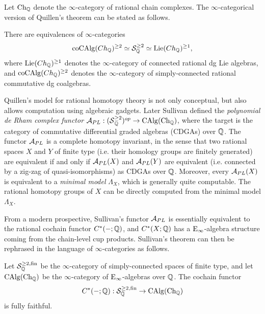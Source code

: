 Let $\operatorname{Ch}_{{\mathbb{Q}}}$ denote the $\infty$-category of rational chain complexes. The $\infty$-categorical version of Quillen's theorem can be stated as follows.
\begin{theorem}
    \cite{Quillen_RHT}
    There are equivalences of $\infty$-categories
    $$
	\operatorname{coCAlg}(Ch_{{\mathbb{Q}}})^{\geq 2}\simeq {\mathcal{S}}^{\geq 2}_{{\mathbb{Q}}} \simeq \operatorname{Lie}(Ch_{{\mathbb{Q}}})^{\geq 1},
	$$
	where $\operatorname{Lie}(Ch_{{\mathbb{Q}}})^{\geq 1}$ denotes the $\infty$-category of connected rational dg Lie algebras, and $\operatorname{coCAlg}(Ch_{{\mathbb{Q}}})^{\geq 2}$ denotes the $\infty$-category of simply-connected rational commutative dg coalgebras.
\end{theorem}
Quillen's model for rational homotopy theory is not only conceptual, but also allows computation using algebraic gadgets. 
Later Sullivan \cite{Sullivan} defined the \emph{polynomial de Rham complex functor} ${\mathcal{A}}_{PL}:(\operatorname{\mathcal{S}}^{\geq 2}_{{\mathbb{Q}}})^{op} \to \operatorname{CAlg}(\operatorname{Ch}_{{\mathbb{Q}}})$, where the target is the category of commutative differential graded algebras (CDGAs) over ${\mathbb{Q}}$.
The functor ${\mathcal{A}}_{PL}$ is a complete homotopy invariant, in the sense that two rational spaces $X$ and $Y$ of finite type (i.e. their homology groups are finitely generated) are equivalent if and only if ${\mathcal{A}}_{PL}(X)$ and ${\mathcal{A}}_{PL}(Y)$ are equivalent (i.e. connected by a zig-zag of quasi-isomorphisms) as CDGAs over ${\mathbb{Q}}$.
Moreover, every ${\mathcal{A}}_{PL}(X)$ is equivalent to a \emph{minimal model} $\Lambda_X$, which is generally quite computable. The rational homotopy groups of $X$ can be directly computed from the minimal model $\Lambda_X$. 

From a modern prospective, Sullivan's functor ${\mathcal{A}}_{PL}$ is essentially equivalent to the rational cochain functor $C^*(-;{\mathbb{Q}})$, and $C^*(X;{\mathbb{Q}})$ has a $\operatorname{E}_\infty$-algebra structure coming from the chain-level cup products. Sullivan's theorem can then be rephrased in the language of $\infty$-categories as follows.
\begin{theorem}
    \cite{Sullivan}
    Let ${\mathcal{S}}^{\geq 2, \operatorname{fin}}_{{\mathbb{Q}}}$ be the $\infty$-category of simply-connected spaces of finite type, and let  $\operatorname{CAlg}(\operatorname{Ch}_{{\mathbb{Q}}})$ be the $\infty$-category of $\operatorname{E}_{\infty}$-algebras over ${\mathbb{Q}}$.
    The cochain functor 
$$
C^*(-;{\mathbb{Q}}): {\mathcal{S}}^{\geq 2, \operatorname{fin}}_{{\mathbb{Q}}}
\to 
\operatorname{CAlg}(\operatorname{Ch}_{{\mathbb{Q}}})
$$ 
is fully faithful.
\end{theorem}

